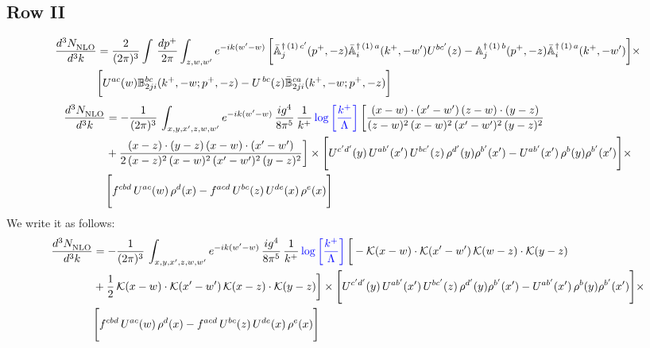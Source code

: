 \documentclass[9pt]{article}
\def\mf#1{\mathbb{#1}}
\numberwithin{equation}{section}
\begin{document}
\subsection{Row II}
\begin{align}
    \frac{d^{3}N_{\rm NLO}^{\rm}}{d^{3}k}  & =    \frac{2}{(2\pi)^{3}} \int\, \frac{dp^{+}}{2\pi}\int_{z,w,w^{\prime}} e^{-ik(w^{\prime}-w)}\,\bigg[\Bar{\mf{A}}^{\dagger\,(1)\, c^{\prime}}_{j}(p^{+},-z)\Bar{\mf{A}}^{\dagger\, (1)\, a}_{i}(k^{+},- w^{\prime})U^{bc^{\prime}}(z) - \mf{A}^{\dagger\, (1)\, b}_{j}(p^{+},- z)\Bar{\mf{A}}^{\dagger\, (1)\, a}_{i}(k^{+},- w^{\prime})\bigg] \times \notag \\ & \bigg[U^{ac}(w) \mf{B}^{bc}_{2ji}(k^{+},-w;p^{+},-z) -U^{\, bc}(z)\Bar{\mf{B}}^{ca}_{2ji}(k^{+},-w; p^{+},-z)\bigg] \nonumber
\end{align}
\begin{align}
 \frac{d^{3}N_{\rm NLO}^{\rm}}{d^{3}k}  & =    -\frac{1}{(2\pi)^{3}}\, \int_{x,y,x',z,w,w^{\prime}} e^{-ik(w^{\prime}-w)}\,\frac{ig^{4}}{8\pi^{5}}\,\frac{1}{k^{+}}\,{\color{blue}\log{\left[\frac{k^{+}}{\Lambda}\right]}}\,\bigg[\frac{(x-w)\cdot (x'-w')\,(z-w)\cdot (y-z)}{(z-w)^{2}\,(x-w)^{2}\,(x'-w')^{2}\,(y-z)^{2}}\notag \\ & +\frac{(x-z)\cdot (y-z)\,(x-w)\cdot (x'-w')}{2\,(x-z)^{2}\, (x-w)^{2}\,(x'-w')^{2}\,(y-z)^{2}}\bigg]\times\Bigg[U^{c'd'}(y)\,U^{ab'}(x')\,U^{bc'}(z)\,\rho^{d'}(y)\rho^{b'}(x')-U^{ab'}(x')\,\rho^{b}(y)\rho^{b'}(x')\Bigg]\times\notag \\ & \Bigg[f^{cbd}\,U^{ac}(w)\,\rho^{d}(x)-f^{acd}\, U^{bc}(z)\,U^{de}(x)\,\rho^{e}(x)\Bigg]
\end{align}
We write it as follows:
\begin{align}
 \frac{d^{3}N_{\rm NLO}^{\rm}}{d^{3}k}  & =    -\frac{1}{(2\pi)^{3}}\, \int_{x,y,x',z,w,w^{\prime}} e^{-ik(w^{\prime}-w)}\,\frac{ig^{4}}{8\pi^{5}}\,\frac{1}{k^{+}}\,{\color{blue}\log{\left[\frac{k^{+}}{\Lambda}\right]}}\,\bigg[-\mathcal{K}(x-w)\cdot \mathcal{K}(x'-w')\, \mathcal{K}(w-z)\cdot \mathcal{K}(y-z)\notag \\ & +\frac{1}{2}\,\mathcal{K}(x-w)\cdot \mathcal{K}(x'-w')\, \mathcal{K}(x-z)\cdot \mathcal{K}(y-z)\bigg]\times\Bigg[U^{c'd'}(y)\,U^{ab'}(x')\,U^{bc'}(z)\,\rho^{d'}(y)\rho^{b'}(x')-U^{ab'}(x')\,\rho^{b}(y)\rho^{b'}(x')\Bigg]\times\notag \\ & \Bigg[f^{cbd}\,U^{ac}(w)\,\rho^{d}(x)-f^{acd}\, U^{bc}(z)\,U^{de}(x)\,\rho^{e}(x)\Bigg]
\end{align}
\end{document}
